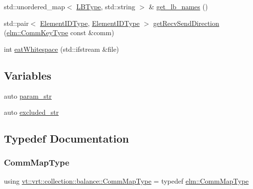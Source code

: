 \begin{DoxyCompactItemize}
\item 
std\+::unordered\+\_\+map$<$ \hyperlink{namespacevt_1_1vrt_1_1collection_1_1balance_ac4f99693509affcc67db182d4aad9b5c}{L\+B\+Type}, std\+::string $>$ \& \hyperlink{namespacevt_1_1vrt_1_1collection_1_1balance_ab24424d5cc677e1c6dfe67d5e03efc70}{get\+\_\+lb\+\_\+names} ()
\item 
std\+::pair$<$ \hyperlink{namespacevt_1_1vrt_1_1collection_1_1balance_a592736f733df4f90856df90a1fd08905}{Element\+I\+D\+Type}, \hyperlink{namespacevt_1_1vrt_1_1collection_1_1balance_a592736f733df4f90856df90a1fd08905}{Element\+I\+D\+Type} $>$ \hyperlink{namespacevt_1_1vrt_1_1collection_1_1balance_a00d08e980a291c93c4c8b34101e7cd3f}{get\+Recv\+Send\+Direction} (\hyperlink{namespacevt_1_1elm_a89067ebf8407548591583dd2f60b53b5}{elm\+::\+Comm\+Key\+Type} const \&comm)
\item 
int \hyperlink{namespacevt_1_1vrt_1_1collection_1_1balance_a605ea184edf7f99b0022f960f71bf4d4}{eat\+Whitespace} (std\+::ifstream \&file)
\end{DoxyCompactItemize}
\subsection*{Variables}
\begin{DoxyCompactItemize}
\item 
auto \hyperlink{namespacevt_1_1vrt_1_1collection_1_1balance_aaed7e09146a45c2932ca185a55161723}{param\+\_\+str}
\item 
auto \hyperlink{namespacevt_1_1vrt_1_1collection_1_1balance_af2f6674ecc7191ddbfe31e87569fe334}{excluded\+\_\+str}
\end{DoxyCompactItemize}


\subsection{Typedef Documentation}
\mbox{\label{namespacevt_1_1vrt_1_1collection_1_1balance_a01ee1fb0ae2da1d2ab7fdca3be9ae351}} 
\subsubsection{\texorpdfstring{Comm\+Map\+Type}{CommMapType}}
{\footnotesize\ttfamily using \hyperlink{namespacevt_1_1vrt_1_1collection_1_1balance_a01ee1fb0ae2da1d2ab7fdca3be9ae351}{vt\+::vrt\+::collection\+::balance\+::\+Comm\+Map\+Type} = typedef \hyperlink{namespacevt_1_1elm_a38487cb8896b9b4763efa9022fab560e}{elm\+::\+Comm\+Map\+Type}}

